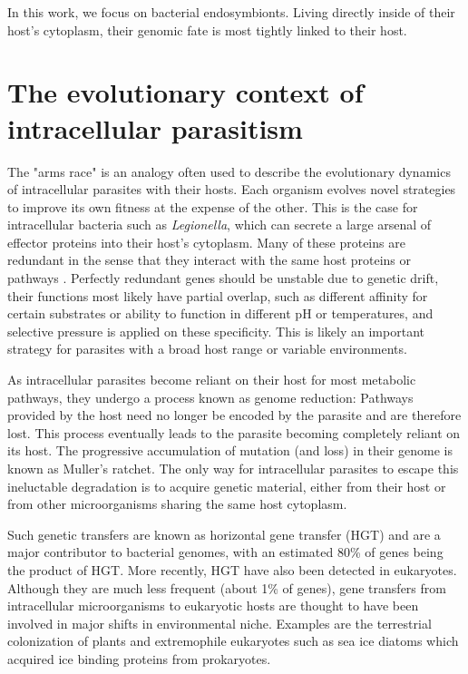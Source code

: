 In this work, we  focus on bacterial endosymbionts. Living directly inside of their host's cytoplasm, their genomic fate is most tightly linked to their host.

\section{The evolutionary context of intracellular parasitism}

The "arms race" is an analogy often used to describe the evolutionary dynamics of intracellular parasites with their hosts. Each organism evolves novel strategies to improve its own fitness at the expense of the other. This is the case for intracellular bacteria such as \textit{Legionella}, which can secrete a large arsenal of effector proteins into their host's cytoplasm. Many of these proteins are redundant in the sense that they interact with the same host proteins or pathways \cite{Ghosh2017}. Perfectly redundant genes should be unstable due to genetic drift, their functions most likely have partial overlap, such as different affinity for certain substrates or ability to function in different pH or temperatures, and selective pressure is applied on these specificity. This is likely an important strategy for parasites with a broad host range or variable environments.

As intracellular parasites become reliant on their host for most metabolic pathways, they undergo a process known as genome reduction: Pathways provided by the host need no longer be encoded by the parasite and are therefore lost. This process eventually leads to the parasite becoming completely reliant on its host. The progressive accumulation of mutation (and loss) in their genome is known as Muller's ratchet. The only way for intracellular parasites to escape this ineluctable degradation is to acquire genetic material, either from their host or from other microorganisms sharing the same host cytoplasm.

Such genetic transfers are known as horizontal gene transfer (HGT) and are a major contributor to bacterial genomes, with an estimated 80\% of genes being the product of HGT. More recently, HGT have also been detected in eukaryotes. Although they are much less frequent (about 1\% of genes), gene transfers from intracellular microorganisms to eukaryotic hosts are thought to have been involved in major shifts in environmental niche. Examples are the terrestrial colonization of plants and extremophile eukaryotes such as sea ice diatoms which acquired ice binding proteins from prokaryotes.


